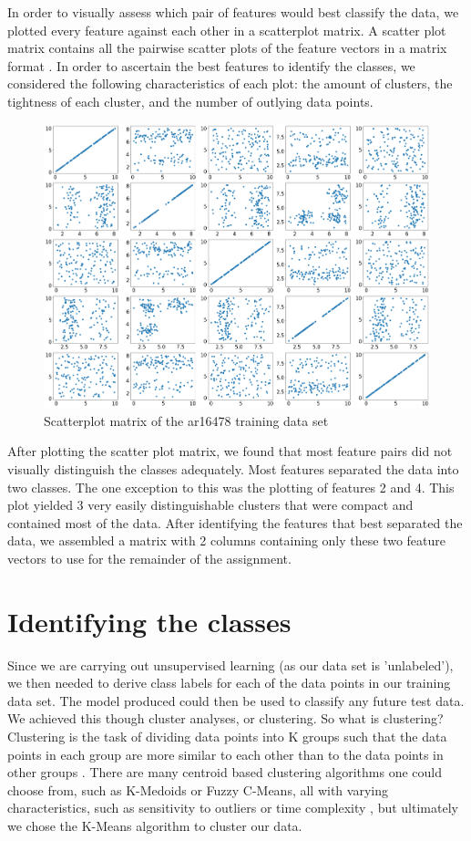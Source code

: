 \documentclass[a4paper]{article}
\begin{document}
In order to visually assess which pair of features would best classify the data, we plotted every feature against each other in a scatterplot matrix. A scatter plot matrix contains all the pairwise scatter plots of the feature vectors in a matrix format \cite{scatterplot}. In order to ascertain the best features to identify the classes, we considered the following characteristics of each plot: the amount of clusters, the tightness of each cluster, and the number of outlying data points. 
\begin{figure}[h!]
\centering
\includegraphics[width=1\columnwidth]{plot1.png}
\caption{Scatterplot matrix of the ar16478 training data set}
\end{figure}

After plotting the scatter plot matrix, we found that most feature pairs did not visually distinguish the classes adequately. Most features separated the data into two classes. The one exception to this was the plotting of features 2 and 4. This plot yielded 3 very easily distinguishable clusters that were compact and contained most of the data. After identifying the features that best separated the data, we assembled a matrix with 2 columns containing only these two feature vectors to use for the remainder of the assignment.

\section{Identifying the classes}

Since we are carrying out unsupervised learning (as our data set is 'unlabeled'), we then needed to derive class labels for each of the data points in our training data set. The model produced could then be used to classify any future test data. We achieved this though cluster analyses, or clustering. So what is clustering? Clustering is the task of dividing data points into K groups such that the data points in each group are more similar to each other than to the data points in other groups \cite{clusteringdef}. There are many centroid based clustering algorithms one could choose from, such as K-Medoids or Fuzzy C-Means, all with varying characteristics, such as sensitivity to outliers or time complexity \cite{clarion}, but ultimately we chose the K-Means algorithm to cluster our data.
\end{document}
